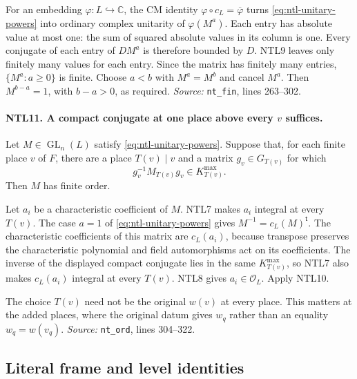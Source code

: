 For an embedding \(\varphi:L\hookrightarrow\mathbb C\), the CM
identity \(\varphi\circ c_L=\overline{\varphi}\) turns
\eqref{eq:ntl-unitary-powers} into ordinary complex unitarity of
\(\varphi(M^a)\).  Each entry has absolute value at most one: the
sum of squared absolute values in its column is one.  Every conjugate
of each entry of \(DM^a\) is therefore bounded by \(D\).
NTL9 leaves only finitely many values for each entry.  Since the
matrix has finitely many entries, \(\{M^a:a\ge0\}\) is finite.
Choose \(a<b\) with \(M^a=M^b\) and cancel \(M^a\).  Then
\(M^{b-a}=1\), with \(b-a>0\), as required.
\emph{Source:} \texttt{nt\_fin}, lines 263--302.

\paragraph{NTL11. A compact conjugate at one place above every \(v\) suffices.}
\label{claim:NTL11}
Let \(M\in\operatorname{GL}_n(L)\) satisfy
\eqref{eq:ntl-unitary-powers}.  Suppose that, for each finite place
\(v\) of \(F\), there are a place \(T(v)\mid v\) and a matrix
\(g_v\in G_{T(v)}\) for which
\[
 g_v^{-1}M_{T(v)}g_v\in K_{T(v)}^{\max}.
\]
Then \(M\) has finite order.

Let \(a_i\) be a characteristic coefficient of \(M\).  NTL7 makes
\(a_i\) integral at every \(T(v)\).  The case \(a=1\) of
\eqref{eq:ntl-unitary-powers} gives
\(M^{-1}=c_L(M)^{\mathsf t}\).  The characteristic coefficients of
this matrix are \(c_L(a_i)\), because transpose preserves the
characteristic polynomial and field automorphisms act on its
coefficients.  The inverse of the displayed compact conjugate lies
in the same \(K_{T(v)}^{\max}\), so NTL7 also makes
\(c_L(a_i)\) integral at every \(T(v)\).  NTL8 gives
\(a_i\in\mathcal O_L\).  Apply NTL10.

The choice \(T(v)\) need not be the original \(w(v)\) at every place.
This matters at the added places, where the original datum gives
\(w_q\) rather than an equality \(w_q=w(v_q)\).
\emph{Source:} \texttt{nt\_ord}, lines 304--322.

\subsection{Literal frame and level identities}

